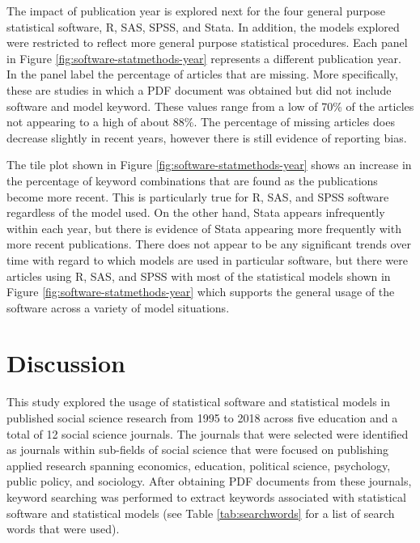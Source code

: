 \documentclass[
  english,
  ,man]{apa6}
\begin{document}
The impact of publication year is explored next for the four general purpose statistical software, R, SAS, SPSS, and Stata. In addition, the models explored were restricted to reflect more general purpose statistical procedures. Each panel in Figure \ref{fig:software-statmethods-year} represents a different publication year. In the panel label the percentage of articles that are missing. More specifically, these are studies in which a PDF document was obtained but did not include software and model keyword. These values range from a low of 70\% of the articles not appearing to a high of about 88\%. The percentage of missing articles does decrease slightly in recent years, however there is still evidence of reporting bias.

The tile plot shown in Figure \ref{fig:software-statmethods-year} shows an increase in the percentage of keyword combinations that are found as the publications become more recent. This is particularly true for R, SAS, and SPSS software regardless of the model used. On the other hand, Stata appears infrequently within each year, but there is evidence of Stata appearing more frequently with more recent publications. There does not appear to be any significant trends over time with regard to which models are used in particular software, but there were articles using R, SAS, and SPSS with most of the statistical models shown in Figure \ref{fig:software-statmethods-year} which supports the general usage of the software across a variety of model situations.

\hypertarget{discussion}{%
\section{Discussion}\label{discussion}}

This study explored the usage of statistical software and statistical models in published social science research from 1995 to 2018 across five education and a total of 12 social science journals. The journals that were selected were identified as journals within sub-fields of social science that were focused on publishing applied research spanning economics, education, political science, psychology, public policy, and sociology. After obtaining PDF documents from these journals, keyword searching was performed to extract keywords associated with statistical software and statistical models (see Table \ref{tab:searchwords} for a list of search words that were used).
\end{document}
